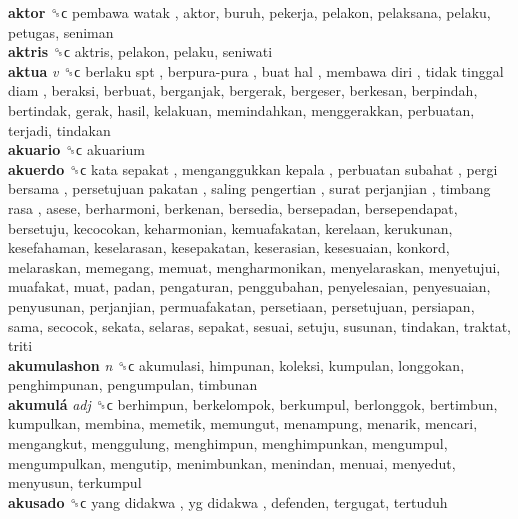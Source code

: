 \textbf{aktor} ␝ϲ   pembawa watak , aktor, buruh, pekerja, pelakon, pelaksana, pelaku, petugas, seniman  \\
\textbf{aktris} ␝ϲ  aktris, pelakon, pelaku, seniwati  \\
\textbf{aktua} \emph{v}  ␝ϲ   berlaku spt ,  berpura-pura ,  buat hal ,  membawa diri ,  tidak tinggal diam , beraksi, berbuat, berganjak, bergerak, bergeser, berkesan, berpindah, bertindak, gerak, hasil, kelakuan, memindahkan, menggerakkan, perbuatan, terjadi, tindakan  \\
\textbf{akuario} ␝ϲ  akuarium  \\
\textbf{akuerdo} ␝ϲ   kata sepakat ,  menganggukkan kepala ,  perbuatan subahat ,  pergi bersama ,  persetujuan pakatan ,  saling pengertian ,  surat perjanjian ,  timbang rasa , asese, berharmoni, berkenan, bersedia, bersepadan, bersependapat, bersetuju, kecocokan, keharmonian, kemuafakatan, kerelaan, kerukunan, kesefahaman, keselarasan, kesepakatan, keserasian, kesesuaian, konkord, melaraskan, memegang, memuat, mengharmonikan, menyelaraskan, menyetujui, muafakat, muat, padan, pengaturan, penggubahan, penyelesaian, penyesuaian, penyusunan, perjanjian, permuafakatan, persetiaan, persetujuan, persiapan, sama, secocok, sekata, selaras, sepakat, sesuai, setuju, susunan, tindakan, traktat, triti  \\
\textbf{akumulashon} \emph{n}  ␝ϲ  akumulasi, himpunan, koleksi, kumpulan, longgokan, penghimpunan, pengumpulan, timbunan  \\
\textbf{akumulá} \emph{adj}  ␝ϲ  berhimpun, berkelompok, berkumpul, berlonggok, bertimbun, kumpulkan, membina, memetik, memungut, menampung, menarik, mencari, mengangkut, menggulung, menghimpun, menghimpunkan, mengumpul, mengumpulkan, mengutip, menimbunkan, menindan, menuai, menyedut, menyusun, terkumpul  \\
\textbf{akusado} ␝ϲ   yang didakwa ,  yg didakwa , defenden, tergugat, tertuduh  \\
